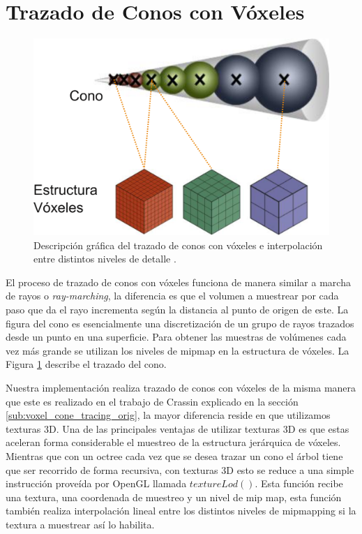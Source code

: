 \section{Trazado de Conos con Vóxeles} %

\label{sec:trazado_de_conos_con_voxeles}

\begin{figure}
	\includegraphics[width=0.95\linewidth]{media/vct_explain.png}
	\caption{Descripción gráfica del trazado de conos con vóxeles e interpolación entre distintos niveles de detalle \cite{Oliver:2012:UEE:2341836.2341909}.}
	\label{fig:vct_explain}
\end{figure}

El proceso de trazado de conos con vóxeles funciona de manera similar a marcha de rayos o \emph{ray-marching}, la diferencia es que el volumen a muestrear por cada paso que da el rayo incrementa según la distancia al punto de origen de este. La figura del cono es esencialmente una discretización de un grupo de rayos trazados desde un punto en una superficie. Para obtener las muestras de volúmenes cada vez más grande se utilizan los niveles de mipmap en la estructura de vóxeles. La Figura \ref{fig:vct_explain} describe el trazado del cono.

Nuestra implementación realiza trazado de conos con vóxeles de la misma manera que este es realizado en el trabajo de Crassin explicado en la sección \ref{sub:voxel_cone_tracing_orig}, la mayor diferencia reside en que utilizamos texturas 3D. Una de las principales ventajas de utilizar texturas 3D es que estas aceleran forma considerable el muestreo de la estructura jerárquica de vóxeles. Mientras que con un octree cada vez que se desea trazar un cono el árbol tiene que ser recorrido de forma recursiva, con texturas 3D esto se reduce a una simple instrucción proveída por OpenGL llamada $textureLod()$. Esta función recibe una textura, una coordenada de muestreo y un nivel de mip map, esta función también realiza interpolación lineal entre los distintos niveles de mipmapping si la textura a muestrear así lo habilita.

